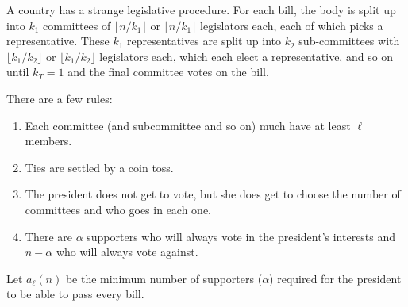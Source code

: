 \documentclass{article}
\begin{document}
  A country has a strange legislative procedure.
  For each bill, the body is split up into $k_1$ committees of
  $\lfloor n/k_1 \rfloor$ or $\lfloor n/k_1 \rfloor$ legislators each,
  each of which picks a representative. These $k_1$ representatives are split up
  into $k_2$ sub-committees with
  $\lfloor k_1/k_2 \rfloor$ or $\lfloor k_1/k_2 \rfloor$ legislators each, which
  each elect a representative, and so on until $k_T=1$ and the final committee
  votes on the bill.

  There are a few rules: \begin{enumerate}
    \item Each committee (and subcommittee and so on) much have at least $\ell$
      members.
    \item Ties are settled by a coin toss.
    \item The president does not get to vote, but she does get to choose the
      number of committees and who goes in each one.
    \item There are $\alpha$ supporters who will always vote in the
    president's interests and $n-\alpha$ who will always vote against.
  \end{enumerate}
  Let $a_\ell(n)$ be the minimum number of supporters ($\alpha$) required for
  the president to be able to pass every bill.
\end{document}
